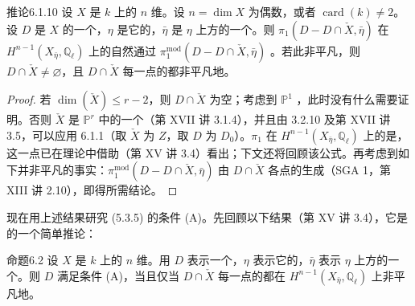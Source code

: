 \begin{SGAresult}{推论}{6.1.10}
设 $X$ 是 $k$ 上的 $n$ 维。设 $n=\dim X$ 为偶数，或者 $\operatorname{card}(k)\neq2$。设 $D$ 是 $X$ 的一个，$\eta$ 是它的，$\bar\eta$ 是 $\eta$ 上方的一个。则 $\pi_1(D-D\cap\check X,\bar\eta)$ 在 $H^{n-1}(X_{\bar\eta},\mathbb Q_\ell)$ 上的自然通过 $\pi_1^{\mathrm{mod}}(D-D\cap\check X,\bar\eta)$ 。若此非平凡，则 $D\cap\check X\neq\varnothing$，且 $D\cap\check X$ 每一点的都非平凡地。
\end{SGAresult}
\begin{proof}
若 $\dim(\check X)\leq r-2$，则 $D\cap\check X$ 为空；考虑到 $\mathbb P^1$ ，此时没有什么需要证明。否则 $\check X$ 是 $\mathbb P^r$ 中的一个（第 XVII 讲 3.1.4），并且由 3.2.10 及第 XVII 讲 3.5，可以应用 6.1.1（取 $\check X$ 为 $Z$，取 $D$ 为 $D_0$）。$\pi_1$ 在 $H^{n-1}(X_{\bar\eta},\mathbb Q_\ell)$ 上的是，这一点已在理论中借助（第 XV 讲 3.4）看出；下文还将回顾该公式。再考虑到如下并非平凡的事实：$\pi_1^{\mathrm{mod}}(D-D\cap\check X,\bar\eta)$ 由 $D\cap\check X$ 各点的生成（SGA 1，第 XIII 讲 2.10），即得所需结论。
\end{proof}
现在用上述结果研究 (5.3.5) 的条件 (A)。先回顾以下结果（第 XV 讲 3.4），它是的一个简单推论：

\begin{SGAresult}{命题}{6.2}
设 $X$ 是 $k$ 上的 $n$ 维。用 $D$ 表示一个，$\eta$ 表示它的，$\bar\eta$ 表示 $\eta$ 上方的一个。则 $D$ 满足条件 (A)，当且仅当 $D\cap\check X$ 每一点的都在 $H^{n-1}(X_{\bar\eta},\mathbb Q_\ell)$ 上非平凡地。
\end{SGAresult}

